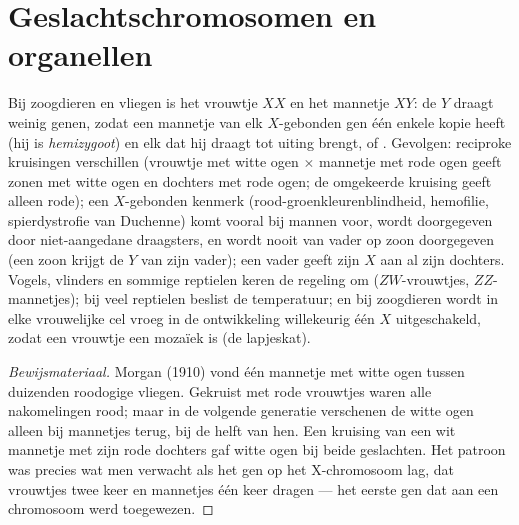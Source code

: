 \section{Geslachtschromosomen en organellen}

\begin{proposition}\label{prop:b2:meiosis-heredity:sexlinked}
Bij zoogdieren en vliegen is het vrouwtje $XX$ en het mannetje $XY$: de $Y$
draagt weinig genen, zodat een mannetje van elk $X$-gebonden gen één
enkele kopie heeft (hij is \emph{hemizygoot}) en elk  dat hij draagt
tot uiting brengt,  of . Gevolgen: reciproke kruisingen
verschillen (vrouwtje met witte ogen $\times$ mannetje met rode ogen geeft
zonen met witte ogen en dochters met rode ogen; de omgekeerde kruising
geeft alleen rode); een  $X$-gebonden kenmerk (rood-groenkleurenblindheid,
hemofilie, spierdystrofie van Duchenne) komt vooral bij mannen voor, wordt
doorgegeven door niet-aangedane draagsters, en wordt nooit van vader op
zoon doorgegeven (een zoon krijgt de $Y$ van zijn vader); een vader geeft
zijn $X$ aan al zijn dochters. Vogels, vlinders en sommige reptielen
keren de regeling om ($ZW$-vrouwtjes, $ZZ$-mannetjes); bij veel reptielen
beslist de temperatuur; en bij zoogdieren wordt in elke vrouwelijke cel
vroeg in de ontwikkeling willekeurig één $X$ uitgeschakeld, zodat een
 vrouwtje een mozaïek is (de lapjeskat).
\end{proposition}
\begin{proof}[Bewijsmateriaal]
Morgan (1910) vond één mannetje met witte ogen tussen duizenden
roodogige vliegen. Gekruist met rode vrouwtjes waren alle nakomelingen
rood; maar in de volgende generatie verschenen de witte ogen alleen bij
mannetjes terug, bij de helft van hen. Een kruising van een wit mannetje
met zijn rode dochters gaf witte ogen bij beide geslachten. Het patroon
was precies wat men verwacht als het gen op het X-chromosoom lag, dat
vrouwtjes twee keer en mannetjes één keer dragen --- het eerste gen dat
aan een chromosoom werd toegewezen.
\end{proof}

